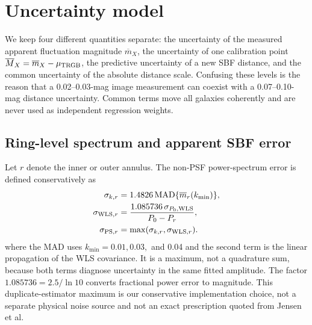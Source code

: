 \documentclass[nodoi,nocopyright]{pas}
\newcommand{\mbar}{\overline{m}}
\newcommand{\Mbar}{\overline{M}}
\begin{document}
\section{Uncertainty model}
\label{sec:errors}
\mbox{}\par

We keep four different quantities separate: the uncertainty of the measured
apparent fluctuation magnitude $\mbar_X$, the uncertainty of one calibration
point $\Mbar_X=\mbar_X-\mu_{\rm TRGB}$, the predictive uncertainty of a new
SBF distance, and the common uncertainty of the absolute distance scale.
Confusing these levels is the reason that a 0.02--0.03-mag image measurement
can coexist with a 0.07--0.10-mag distance uncertainty. Common terms move all
galaxies coherently and are never used as independent regression weights.

\subsection{Ring-level spectrum and apparent SBF error}

Let $r$ denote the inner or outer annulus. The non-PSF power-spectrum error is
defined conservatively as
\begin{align}
 \sigma_{k,r}&=1.4826\,{\rm MAD}\{\mbar_r(k_{\min})\},\\
 \sigma_{{\rm WLS},r}&=
 \frac{1.085736\,\sigma_{P_0,{\rm WLS}}}{P_0-P_r},\\
 \sigma_{{\rm PS},r}&=\max(\sigma_{k,r},\sigma_{{\rm WLS},r}).
 \label{eq:ps-error}
\end{align}
where the MAD uses $k_{\min}=0.01,0.03,$ and 0.04 and the second term is the
linear propagation of the WLS covariance. It is a maximum, not a quadrature
sum, because both terms diagnose uncertainty in the same fitted amplitude.
The factor $1.085736=2.5/\ln10$ converts fractional power error to magnitude.
This duplicate-estimator maximum is our conservative implementation choice,
not a separate physical noise source and not an exact prescription quoted
from Jensen et al.
\end{document}

